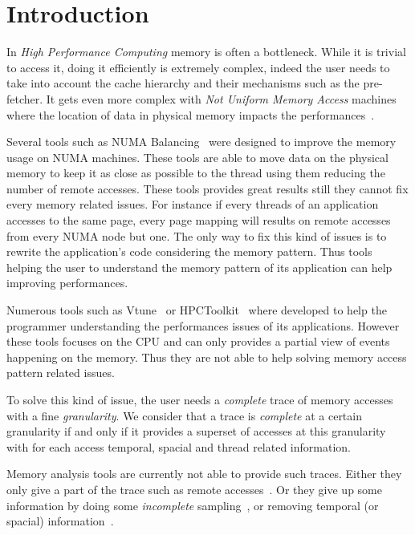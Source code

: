 \section{Introduction}
\label{sec:intro}

In \emph{High Performance Computing} memory is often a bottleneck.
While it is trivial to access it, doing it efficiently is extremely
complex, indeed the user needs to take into account the cache hierarchy and
their mechanisms such as the pre-fetcher. It gets even more complex with
\emph{Not Uniform Memory Access} machines where the location of data in
physical memory impacts the performances~\cite{Drepper07What}.

Several tools such as NUMA Balancing~\cite{Corbet2012} were designed to improve the
memory usage on NUMA machines. These tools are able to move data on the
physical memory to keep it as close as possible to the thread using them
reducing the number of remote accesses. These tools provides great results
still they cannot fix every memory related issues. For instance if every
threads of an application accesses to the same page, every page mapping will
results on remote accesses from every NUMA node but one. The only way to fix
this kind of issues is to rewrite the application's code considering the
memory pattern. Thus tools helping the user to understand the memory pattern
of its application can help improving performances.

Numerous tools such as Vtune~\cite{Reinders05VTune} or
HPCToolkit~\cite{Adhianto10HPCTOOLKIT} where developed to help the programmer
understanding the performances issues of its applications. However these tools
focuses on the CPU and can only provides a partial view of events happening on
the memory. Thus they are not able to help solving memory access pattern
related issues.

To solve this kind of issue, the user needs a \emph{complete} trace of memory
accesses with a fine \emph{granularity}. We consider that a trace is
\emph{complete} at a certain granularity if and only if it provides a superset
of accesses at this granularity with for each access temporal, spacial and
thread related information.

Memory analysis tools are currently not able to provide such traces. Either
they only give a part of the trace such as
remote accesses~\cite{Lachaize12MemProf}. Or they give up some information by
doing some \emph{incomplete} sampling~\cite{Liu14Tool}, or removing temporal
(or spacial) information~\cite{Beniamine15TabarnacRR}.

